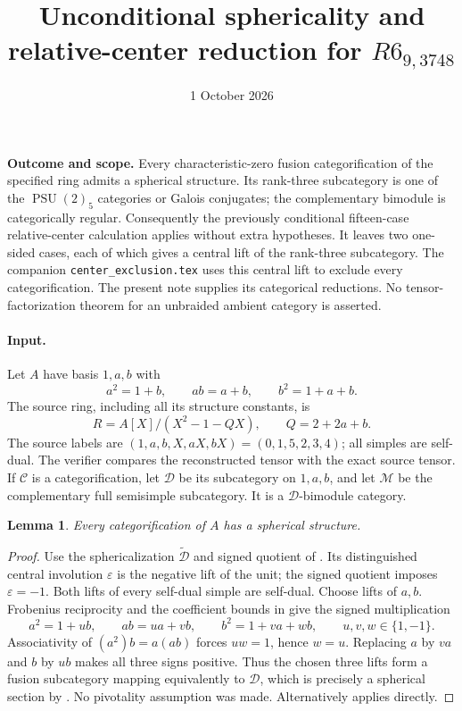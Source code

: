 \documentclass[11pt]{article}
\title{Unconditional sphericality and relative-center reduction for $R6_{9,3748}$}
\author{}\date{1 October 2026}
\newtheorem{lemma}{Lemma}
\begin{document}
\maketitle

\noindent\textbf{Outcome and scope.}
Every characteristic-zero fusion categorification of the specified ring admits a
spherical structure. Its rank-three subcategory is one of the $\operatorname{PSU}(2)_5$
categories or Galois conjugates; the complementary bimodule is categorically
regular. Consequently the previously conditional fifteen-case relative-center
calculation applies without extra hypotheses. It leaves two one-sided cases,
each of which gives a central lift of the rank-three subcategory.
The companion \texttt{center\_exclusion.tex} uses this central lift to
exclude every categorification. The present note supplies its categorical
reductions. No tensor-factorization theorem for an unbraided ambient
category is asserted.

\paragraph{Input.}
Let $A$ have basis $1,a,b$ with
\[
 a^2=1+b,\qquad ab=a+b,\qquad b^2=1+a+b.
\]
The source ring, including all its structure constants, is
\[
 R=A[X]/(X^2-1-QX),\qquad Q=2+2a+b.
\]
The source labels are $(1,a,b,X,aX,bX)=(0,1,5,2,3,4)$; all simples
are self-dual. The verifier compares the reconstructed tensor with the exact
source tensor. If $\mathcal C$ is a categorification, let $\mathcal D$ be its
subcategory on $1,a,b$, and let $\mathcal M$ be the complementary full
semisimple subcategory. It is a $\mathcal D$-bimodule category.

\begin{lemma}
Every categorification of $A$ has a spherical structure.
\end{lemma}
\begin{proof}
Use the sphericalization $\widetilde{\mathcal D}$ and signed quotient of
\cite[Section 5.1]{OstrikRank3}. Its distinguished central involution
$\varepsilon$ is the negative lift of the unit; the signed quotient imposes
$\varepsilon=-1$. Both lifts of every self-dual simple are self-dual.
Choose lifts of $a,b$. Frobenius reciprocity and the coefficient bounds in
\cite[Section 5.1(b)]{OstrikRank3} give the signed multiplication
\[
 a^2=1+ub,\qquad ab=ua+vb,\qquad b^2=1+va+wb,
 \qquad u,v,w\in\{1,-1\}.
\]
Associativity of $(a^2)b=a(ab)$ forces $uw=1$, hence $w=u$.
Replacing $a$ by $va$ and $b$ by $ub$ makes all three signs positive.
Thus the chosen three lifts form a fusion subcategory mapping equivalently to
$\mathcal D$, which is precisely a spherical section by
\cite[Section 5.1(c)]{OstrikRank3}. No pivotality assumption was made.
Alternatively \cite[Theorem 5.8]{OstrikRank3} applies directly.
\end{proof}
\end{document}
